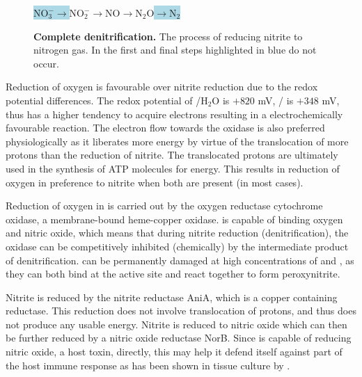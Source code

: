 \begin{figure}[tbp]
	\begin{center}
	\colorbox{LightBlue}{$\mathrm{NO}_3^-\rightarrow$}$\mathrm{NO}_2^-\rightarrow\mathrm{NO}\rightarrow\mathrm{N}_2\mathrm{O}$\colorbox{LightBlue}{$\rightarrow\mathrm{N}_2$}
	\caption[{Complete denitrification.}]{{\bf Complete denitrification.} The process of reducing nitrite to nitrogen gas. In \Nm{} the first and final steps highlighted in blue do not occur.
	\label{fig:completedenitrification}}
	\end{center}
\end{figure}

Reduction of oxygen is favourable over nitrite reduction due to the redox potential differences. The redox potential of \cOxygen{}/H$_{\textrm{2}}$O is $+820$ mV, \cNitrite{}/\cNO{} is $+348$ mV, thus \cOxygen{} has a higher tendency to acquire electrons resulting in a electrochemically favourable reaction\cite{Deeudom2007}. The electron flow towards the oxidase is also preferred physiologically as it liberates more energy by virtue of the translocation of more protons than the reduction of nitrite. The translocated protons are ultimately used in the synthesis of ATP molecules for energy. This results in reduction of oxygen in preference to nitrite when both are present (in most cases).

Reduction of oxygen in \Nm{} is carried out by the oxygen reductase cytochrome \cbbthree{} oxidase, a membrane-bound heme-copper oxidase\cite{Preisig1996}. \cbbthree{} is capable of binding oxygen and nitric oxide, which means that during nitrite reduction (denitrification), the oxidase can be competitively inhibited (chemically) by the intermediate product of denitrification. \cbbthree{} can be permanently damaged at high concentrations of \cNO{} and \cOxygen{}, as they can both bind at the \cbbthree{} active site and react together to form peroxynitrite\cite{Brown1994,Sharpe1998,Anjum2002}.

Nitrite is reduced by the nitrite reductase AniA, which is a copper containing reductase. This reduction does not involve translocation of protons, and thus does not produce any usable energy. Nitrite is reduced to nitric oxide which can then be further reduced by a nitric oxide reductase NorB. Since \Nm{} is capable of reducing nitric oxide, a host toxin, directly, this may help it defend itself against part of the host immune response\cite{Heurlier2008,Rock2005} as has been shown in tissue culture by \citet{Anjum2002}.

